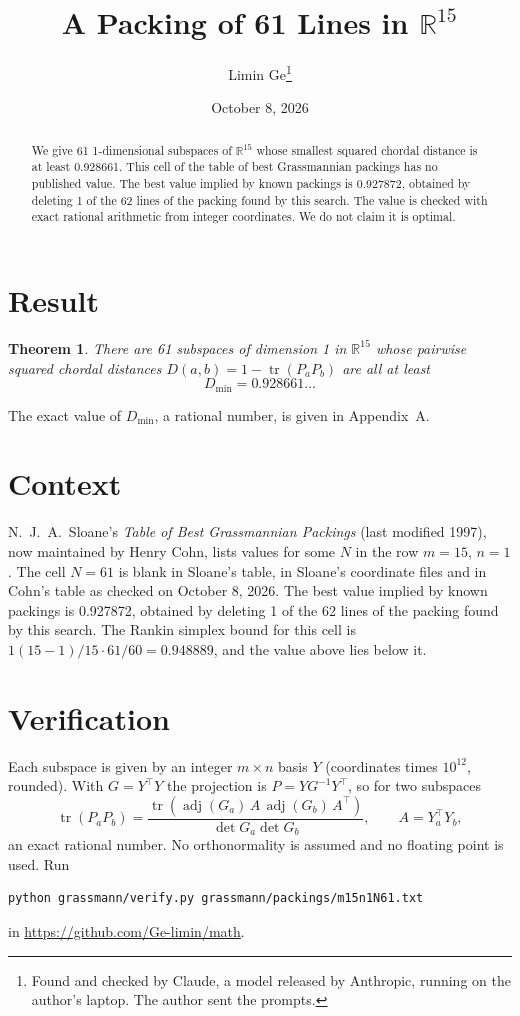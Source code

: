 \documentclass[11pt,a4paper]{article}
\title{A Packing of 61 Lines in $\mathbb{R}^{15}$}
\author{Limin Ge\thanks{Found and checked by Claude, a model released by Anthropic, running on the author's laptop. The author sent the prompts.}}
\date{October 8, 2026}
\newtheorem*{theorem}{Theorem}
\begin{document}
\maketitle
\begin{abstract}
We give 61 1-dimensional subspaces of $\mathbb{R}^{15}$ whose smallest squared chordal distance is at least 0.928661. This cell of the table of best Grassmannian packings has no published value. The best value implied by known packings is 0.927872, obtained by deleting 1 of the 62 lines of the packing found by this search. The value is checked with exact rational arithmetic from integer coordinates. We do not claim it is optimal.
\end{abstract}

\section{Result}
\begin{theorem}
There are 61 subspaces of dimension 1 in $\mathbb{R}^{15}$ whose pairwise squared chordal distances $D(a,b) = 1 - \operatorname{tr}(P_aP_b)$ are all at least
\[ D_{\min} = 0.928661\ldots \]
\end{theorem}
The exact value of $D_{\min}$, a rational number, is given in Appendix~A.


\section{Context}
N.~J.~A.~Sloane's \emph{Table of Best Grassmannian Packings} (last modified 1997), now maintained by Henry Cohn, lists values for some $N$ in the row $m=15$, $n=1$. The cell $N=61$ is blank in Sloane's table, in Sloane's coordinate files and in Cohn's table as checked on October 8, 2026. The best value implied by known packings is 0.927872, obtained by deleting 1 of the 62 lines of the packing found by this search. The Rankin simplex bound for this cell is $1(15-1)/15\cdot 61/60 = 0.948889$, and the value above lies below it.


\section{Verification}
Each subspace is given by an integer $m\times n$ basis $Y$ (coordinates times $10^{12}$, rounded). With $G=Y^\top Y$ the projection is $P=YG^{-1}Y^\top$, so for two subspaces
\[ \operatorname{tr}(P_aP_b)=\frac{\operatorname{tr}(\operatorname{adj}(G_a)\,A\,\operatorname{adj}(G_b)\,A^\top)}{\det G_a\det G_b},\qquad A=Y_a^\top Y_b, \]
an exact rational number. No orthonormality is assumed and no floating point is used. Run
\begin{verbatim}
python grassmann/verify.py grassmann/packings/m15n1N61.txt
\end{verbatim}
in \url{https://github.com/Ge-limin/math}.
\end{document}
